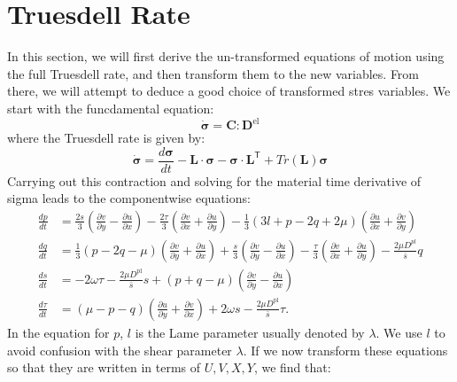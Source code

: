 \documentclass[11pt]{article}
\newcommand{\p}{\partial}
\newcommand{\bsig}{\boldsymbol\sigma}
\newcommand{\bC}{\mathbf{C}}
\newcommand{\bD}{\mathbf{D}}
\newcommand{\bL}{\mathbf{L}}
\newcommand{\Trans}{\mathsf{T}}
\newcommand{\Dpl}{D^\text{pl}}
\newcommand{\bDel}{\bD^\text{el}}
\begin{document}
\section*{Truesdell Rate}
In this section, we will first derive the un-transformed equations of motion using the full Truesdell rate, and then transform them to the new variables. From there, we will attempt to deduce a good choice of transformed stres variables. We start with the funcdamental equation:
\begin{equation}
    \dot{\bsig} = \bC : \bDel
    \label{eqn:sigma_evol}
\end{equation}
where the Truesdell rate is given by:
\begin{equation}
    \dot{\bsig} = \frac{d\bsig}{dt} - \bL\cdot\bsig - \bsig\cdot\bL^\Trans + Tr(\bL)\bsig
    \label{eqn:truesdell_rate}
\end{equation}
Carrying out this contraction and solving for the material time derivative of sigma leads to the componentwise equations:
\begin{align}
    \frac{dp}{dt} &= \frac{2s}{3}\left(\frac{\p v}{\p y} - \frac{\p u}{\p x}\right) - \frac{2\tau}{3}\left(\frac{\p v}{\p x} + \frac{\p u}{\p y}\right) - \frac{1}{3}\left(3 l + p - 2q + 2\mu\right)\left(\frac{\p u}{\p x} + \frac{\p v}{\p y}\right)\\
    \frac{dq}{dt} &= \frac{1}{3}\left(p - 2q - \mu\right)\left(\frac{\p v}{\p y} + \frac{\p u}{\p x}\right) + \frac{s}{3}\left(\frac{\p v}{\p y} - \frac{\p u}{\p x}\right) - \frac{\tau}{3}\left(\frac{\p v}{\p x} + \frac{\p u }{\p y}\right) - \frac{2\mu D^{pl}}{\bar{s}}q\\
    \frac{ds}{dt} &= -2\omega\tau - \frac{2\mu\Dpl}{\bar{s}}s + \left(p + q - \mu\right)\left(\frac{\p v}{\p y} - \frac{\p u}{\p x}\right)\\
    \frac{d\tau}{dt} &= \left(\mu - p - q\right)\left(\frac{\p u}{\p y} + \frac{\p v}{\p x}\right) + 2\omega s - \frac{2\mu\Dpl}{\bar{s}}\tau.
\end{align}
In the equation for $p$, $l$ is the Lame parameter usually denoted by $\lambda$. We use $l$ to avoid confusion with the shear parameter $\lambda$. If we now transform these equations so that they are written in terms of $U, V, X, Y$, we find that:
\end{document}
